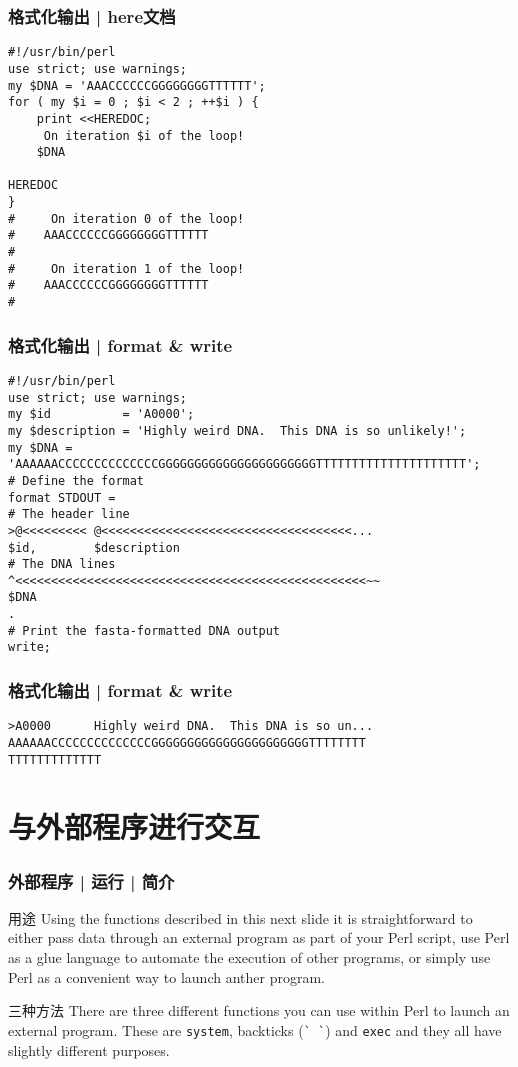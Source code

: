 \begin{frame}[fragile]
  \frametitle{格式化输出 | here文档}
  \vspace{-0.6em}
\begin{lstlisting}
#!/usr/bin/perl
use strict; use warnings;
my $DNA = 'AAACCCCCCGGGGGGGGTTTTTT';
for ( my $i = 0 ; $i < 2 ; ++$i ) {
    print <<HEREDOC;
     On iteration $i of the loop!
    $DNA

HEREDOC
}
#     On iteration 0 of the loop!
#    AAACCCCCCGGGGGGGGTTTTTT
#
#     On iteration 1 of the loop!
#    AAACCCCCCGGGGGGGGTTTTTT
#
\end{lstlisting}
\end{frame}

\begin{frame}[fragile]
  \frametitle{格式化输出 | format \& write}
\begin{lstlisting}[basicstyle=\footnotesize\tt,numberstyle=\scriptsize]
#!/usr/bin/perl
use strict; use warnings;
my $id          = 'A0000';
my $description = 'Highly weird DNA.  This DNA is so unlikely!';
my $DNA = 'AAAAAACCCCCCCCCCCCCCGGGGGGGGGGGGGGGGGGGGGGTTTTTTTTTTTTTTTTTTTTT';
# Define the format
format STDOUT =
# The header line
>@<<<<<<<<< @<<<<<<<<<<<<<<<<<<<<<<<<<<<<<<<<<<<...
$id,        $description
# The DNA lines
^<<<<<<<<<<<<<<<<<<<<<<<<<<<<<<<<<<<<<<<<<<<<<<<<<~~
$DNA
.
# Print the fasta-formatted DNA output
write;
\end{lstlisting}
\end{frame}

\begin{frame}[fragile]
  \frametitle{格式化输出 | format \& write}
\begin{lstlisting}[basicstyle=\footnotesize\tt,numberstyle=\scriptsize]
>A0000      Highly weird DNA.  This DNA is so un...
AAAAAACCCCCCCCCCCCCCGGGGGGGGGGGGGGGGGGGGGGTTTTTTTT
TTTTTTTTTTTTT
\end{lstlisting}
\end{frame}

\section{与外部程序进行交互}
\begin{frame}[fragile]
  \frametitle{外部程序 | 运行 | 简介}
  \begin{block}{用途}
    Using the functions described in this next slide it is straightforward to either pass data through an external program as part of your Perl script, use Perl as a glue language to automate the execution of other programs, or simply use Perl as a convenient way to launch anther program.
  \end{block}
  \pause
  \begin{block}{三种方法}
    There are three different functions you can use within Perl to launch an external program. These are \verb|system|, backticks (\verb|` `|) and \verb|exec| and they all have slightly different purposes.
  \end{block}
\end{frame}

